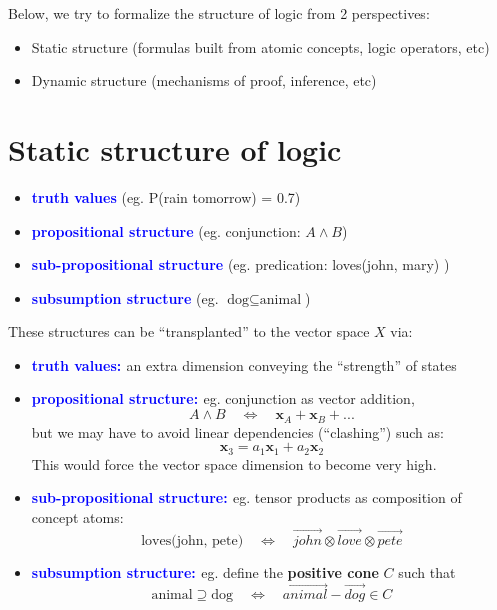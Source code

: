 \documentclass[orivec]{llncs}
\newcommand{\emp}[1]{\textbf{\textcolor{blue}{#1}}}
\newcommand{\vect}[1]{\boldsymbol{#1}}
\begin{document}
Below, we try to formalize the structure of logic from 2 perspectives:
\begin{itemize}
\item Static structure (formulas built from atomic concepts, logic operators, etc)
\item Dynamic structure (mechanisms of proof, inference, etc)
\end{itemize}

\section{Static structure of logic}

\begin{itemize}
\item \emp{truth values} (eg. P(rain tomorrow) = 0.7)
\item \emp{propositional structure} (eg. conjunction: $A \wedge B$) 
\item \emp{sub-propositional structure} (eg. predication: loves(john, mary) )
\item \emp{subsumption structure} (eg. $\mbox{dog} \subseteq \mbox{animal}$)
\end{itemize}

These structures can be ``transplanted'' to the vector space $X$ via:
\begin{itemize}
\item \emp{truth values: } an extra dimension conveying the ``strength'' of states
\item \emp{propositional structure: } eg. conjunction as vector addition,
\begin{equation}
A \wedge B \quad \Leftrightarrow \quad \vect{x}_A + \vect{x}_B + ...
\end{equation}
but we may have to avoid linear dependencies (``clashing'') such as:
\begin{equation}
\vect{x}_3 = a_1 \vect{x}_1 + a_2 \vect{x}_2
\end{equation}
This would force the vector space dimension to become very high.
\item \emp{sub-propositional structure: } eg. tensor products as composition of concept atoms:
\begin{equation}
\mbox{loves(john, pete)} \quad \Leftrightarrow \quad \overrightarrow{john} \otimes \overrightarrow{love} \otimes \overrightarrow{pete}
\end{equation}
\item \emp{subsumption structure: } eg. define the \textbf{positive cone} $C$ such that
\begin{equation}
\mbox{animal} \supseteq \mbox{dog} \quad \Leftrightarrow \quad \overrightarrow{animal} - \overrightarrow{dog} \in C
\end{equation}
\end{itemize}
\end{document}
